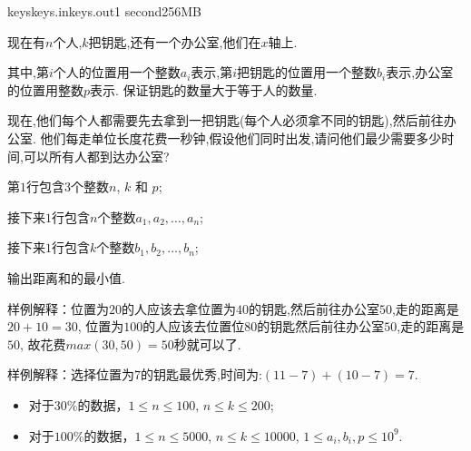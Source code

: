\documentclass[11pt,a4paper,oneside]{article}
\begin{document}
\begin{problem}{keys}{keys.in}{keys.out}{1 second}{256MB}

    现在有$n$个人,$k$把钥匙,还有一个办公室,他们在$x$轴上.
    
    其中,第$i$个人的位置用一个整数$a_i$表示,第$i$把钥匙的位置用一个整数$b_i$表示,办公室的位置用整数$p$表示. 保证钥匙的数量大于等于人的数量.
    
    现在,他们每个人都需要先去拿到一把钥匙(每个人必须拿不同的钥匙),然后前往办公室. 他们每走单位长度花费一秒钟,假设他们同时出发,请问他们最少需要多少时间,可以所有人都到达办公室?

    \InputFile

	第$1$行包含$3$个整数$n$, $k$ 和 $p$;
	
	接下来$1$行包含$n$个整数$a_1,a_2,\dots,a_n$;
	
	接下来$1$行包含$k$个整数$b_1,b_2,\dots,b_n$;

    \OutputFile

	输出距离和的最小值.

    \Example

    \begin{example}
    \end{example}

	样例解释：位置为$20$的人应该去拿位置为$40$的钥匙,然后前往办公室$50$,走的距离是$20 + 10 = 30$, 位置为$100$的人应该去位置位$80$的钥匙然后前往办公室$50$,走的距离是$50$, 故花费$max(30,50) = 50$秒就可以了.
	
	

    \begin{example}
	\end{example}

	样例解释：选择位置为$7$的钥匙最优秀,时间为:$(11-7) + (10-7) = 7$.

    \Note
    
    \begin{itemize}
		\item 对于$30\%$的数据，$1 \leq n \leq 100$, $n \leq k \leq 200$;
		\item 对于$100\%$的数据，$1 \leq n \leq 5000$, $n \leq k \leq 10000$, $1 \leq a_i, b_i, p \leq 10^9$.
    \end{itemize}

\end{problem}
\end{document}
